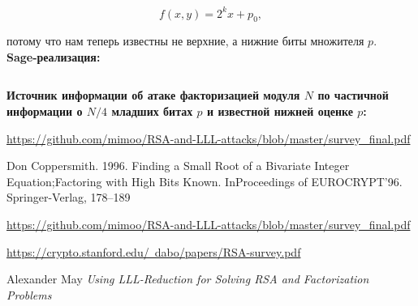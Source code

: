 \documentclass[12pt,a4paper]{scrartcl}
\begin{document}
$$f(x,y)=2^kx+p_0,$$

потому что нам теперь известны не верхние, а нижние биты множителя $p$.\\

\textbf{Sage-реализация:}

\inputminted[tabsize=4,obeytabs,fontsize=\footnotesize]{python3}{./RSA_scripts/lower_bit_p.sage}

\textbf{Источник информации об атаке факторизацией модуля $N$ по частичной информации о $N/4$ младших битах $p$ и известной нижней оценке $p$:}

\href{https://github.com/mimoo/RSA-and-LLL-attacks/blob/master/survey_final.pdf}{https://github.com/mimoo/RSA-and-LLL-attacks/blob/master/survey\_final.pdf}

Don Coppersmith. 1996. Finding a Small Root of a Bivariate Integer Equation;Factoring with High Bits Known. InProceedings of EUROCRYPT’96. Springer-Verlag, 178–189

\href{https://github.com/mimoo/RSA-and-LLL-attacks/blob/master/survey_final.pdf}{https://github.com/mimoo/RSA-and-LLL-attacks/blob/master/survey\_final.pdf}

\href{https://crypto.stanford.edu/~dabo/papers/RSA-survey.pdf}{https://crypto.stanford.edu/~dabo/papers/RSA-survey.pdf}

Alexander May \textit{Using LLL-Reduction for Solving RSA and Factorization Problems}
\end{document}
